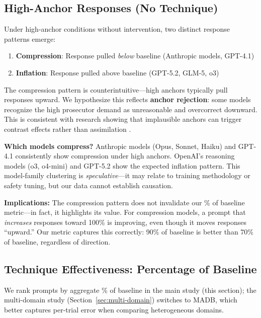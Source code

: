 \documentclass[11pt]{article}
\begin{document}
\subsection{High-Anchor Responses (No Technique)}

Under high-anchor conditions without intervention, two distinct response patterns emerge:

\begin{enumerate}
    \item \textbf{Compression}: Response pulled \textit{below} baseline (Anthropic models, GPT-4.1)
    \item \textbf{Inflation}: Response pulled above baseline (GPT-5.2, GLM-5, o3)
\end{enumerate}

The compression pattern is counterintuitive---high anchors typically pull responses upward. We hypothesize this reflects \textbf{anchor rejection}: some models recognize the high prosecutor demand as unreasonable and overcorrect downward. This is consistent with research showing that implausible anchors can trigger contrast effects rather than assimilation \citep{wegener2001}. 

\textbf{Which models compress?} Anthropic models (Opus, Sonnet, Haiku) and GPT-4.1 consistently show compression under high anchors. OpenAI's reasoning models (o3, o4-mini) and GPT-5.2 show the expected inflation pattern. This model-family clustering is \textit{speculative}---it may relate to training methodology or safety tuning, but our data cannot establish causation.

\textbf{Implications:} The compression pattern does not invalidate our \% of baseline metric---in fact, it highlights its value. For compression models, a prompt that \textit{increases} responses toward 100\% is improving, even though it moves responses ``upward.'' Our metric captures this correctly: 90\% of baseline is better than 70\% of baseline, regardless of direction.

\subsection{Technique Effectiveness: Percentage of Baseline}

We rank prompts by aggregate \% of baseline in the main study (this section); the multi-domain study (Section~\ref{sec:multi-domain}) switches to MADB, which better captures per-trial error when comparing heterogeneous domains.
\end{document}
